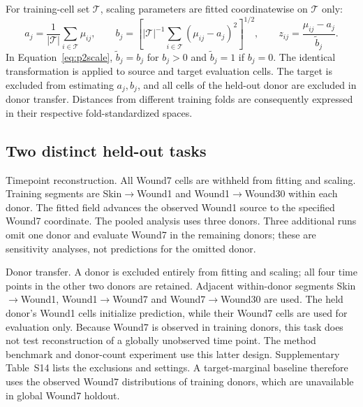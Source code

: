 \documentclass[10pt,a4paper]{article}
\begin{document}
For training-cell set $\mathcal T$, scaling parameters are fitted coordinatewise on $\mathcal T$ only:
\begin{equation}
a_j=\frac1{|\mathcal T|}\sum_{i\in\mathcal T}\mu_{ij},\qquad
b_j=\left[|\mathcal T|^{-1}\sum_{i\in\mathcal T}(\mu_{ij}-a_j)^2\right]^{1/2},\qquad
z_{ij}=\frac{\mu_{ij}-a_j}{\widetilde b_j}.\label{eq:p2scale}
\end{equation}
In Equation~\eqref{eq:p2scale}, $\widetilde b_j=b_j$ for $b_j>0$ and $\widetilde b_j=1$ if $b_j=0$. The identical transformation is applied to source and target evaluation cells. The target is excluded from estimating $a_j,b_j$, and all cells of the held-out donor are excluded in donor transfer. Distances from different training folds are consequently expressed in their respective fold-standardized spaces.

\subsection{Two distinct held-out tasks}
Timepoint reconstruction. All Wound7 cells are withheld from fitting and scaling. Training segments are Skin$\rightarrow$Wound1 and Wound1$\rightarrow$Wound30 within each donor. The fitted field advances the observed Wound1 source to the specified Wound7 coordinate. The pooled analysis uses three donors. Three additional runs omit one donor and evaluate Wound7 in the remaining donors; these are sensitivity analyses, not predictions for the omitted donor.

Donor transfer. A donor is excluded entirely from fitting and scaling; all four time points in the other two donors are retained. Adjacent within-donor segments Skin$\rightarrow$Wound1, Wound1$\rightarrow$Wound7 and Wound7$\rightarrow$Wound30 are used. The held donor's Wound1 cells initialize prediction, while their Wound7 cells are used for evaluation only. Because Wound7 is observed in training donors, this task does not test reconstruction of a globally unobserved time point. The method benchmark and donor-count experiment use this latter design. Supplementary Table~S14 lists the exclusions and settings. A target-marginal baseline therefore uses the observed Wound7 distributions of training donors, which are unavailable in global Wound7 holdout.
\end{document}
